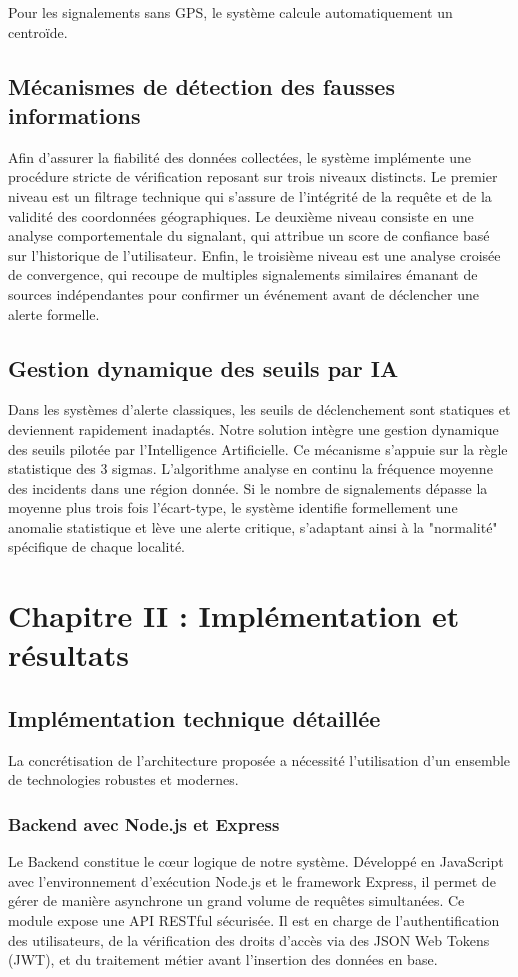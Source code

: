 \documentclass[12pt,a4paper]{article}
\begin{document}
Pour les signalements sans GPS, le système calcule automatiquement un centroïde.

\section{Mécanismes de détection des fausses informations}
Afin d'assurer la fiabilité des données collectées, le système implémente une procédure stricte de vérification reposant sur trois niveaux distincts. Le premier niveau est un filtrage technique qui s'assure de l'intégrité de la requête et de la validité des coordonnées géographiques. Le deuxième niveau consiste en une analyse comportementale du signalant, qui attribue un score de confiance basé sur l'historique de l'utilisateur. Enfin, le troisième niveau est une analyse croisée de convergence, qui recoupe de multiples signalements similaires émanant de sources indépendantes pour confirmer un événement avant de déclencher une alerte formelle.

\section{Gestion dynamique des seuils par IA}
Dans les systèmes d'alerte classiques, les seuils de déclenchement sont statiques et deviennent rapidement inadaptés. Notre solution intègre une gestion dynamique des seuils pilotée par l'Intelligence Artificielle. Ce mécanisme s'appuie sur la règle statistique des 3 sigmas. L'algorithme analyse en continu la fréquence moyenne des incidents dans une région donnée. Si le nombre de signalements dépasse la moyenne plus trois fois l'écart-type, le système identifie formellement une anomalie statistique et lève une alerte critique, s'adaptant ainsi à la "normalité" spécifique de chaque localité.

\chapter{Chapitre II : Implémentation et résultats}

\section{Implémentation technique détaillée}

La concrétisation de l'architecture proposée a nécessité l'utilisation d'un ensemble de technologies robustes et modernes.

\subsection{Backend avec Node.js et Express}
Le Backend constitue le cœur logique de notre système. Développé en JavaScript avec l'environnement d'exécution Node.js et le framework Express, il permet de gérer de manière asynchrone un grand volume de requêtes simultanées. Ce module expose une API RESTful sécurisée. Il est en charge de l'authentification des utilisateurs, de la vérification des droits d'accès via des JSON Web Tokens (JWT), et du traitement métier avant l'insertion des données en base.
\end{document}

